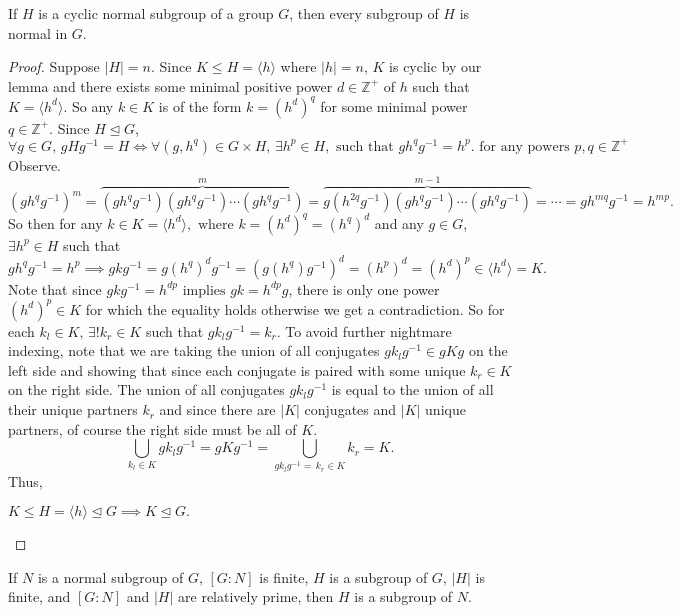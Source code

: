 \documentclass[addpoints,10pt]{exam}
\theoremstyle{plain}
\theoremstyle{definition}
\newtheorem{prob}[thm]{Problem}
\theoremstyle{plain}
\theoremstyle{plain}
\theoremstyle{definition}
\let\oldprob\prob
\let\endoldprob\endprob
\renewenvironment{prob}
  {\begin{singlespace}\oldprob}
  {\endoldprob\end{singlespace}}
\newcommand{\ZZ}{\ensuremath{\mathbb{Z}}}
\begin{document}
\begin{prob}
  If $H$ is a cyclic normal subgroup of a group $G$, then every subgroup of $H$ is normal in $G$.
\end{prob}
\begin{proof}
  Suppose $|H|=n$. Since $K\leq H=\langle h\rangle$ where $|h|=n$, $K$ is cyclic by our lemma and there exists some minimal positive power $d \in \ZZ^{+}$ of $h$ such that $K=\langle h^{d}\rangle.$ So any $k\in K$ is of the form $k=(h^{d})^{q}$ for some minimal power $q\in \ZZ^{+}$. Since $H\trianglelefteq G$, 
  $$\forall g\in G,\,gHg^{-1}=H\iff \forall (g,h^{q})\in G\times H,\,\exists h^{p}\in H,\text{ such that }gh^{q}g^{-1}=h^{p}.\text{ for any powers }p,q\in \ZZ^{+}$$
  Observe.
    $$(gh^{q}g^{-1})^{m}=\overbrace{(gh^{q}g^{-1})(gh^{q}g^{-1})\cdots (gh^{q}g^{-1})}^{m}=\overbrace{g(h^{2q}g^{-1})(gh^{q}g^{-1})\cdots (gh^{q}g^{-1})}^{m-1}=\cdots=gh^{mq}g^{-1}=h^{mp}.$$
  So then for any $k\in K=\langle h^{d}\rangle,\text{ where }k=(h^{d})^{q}=(h^{q})^{d}$ and any $g\in G$, $\exists h^{p}\in H$ such that
    $$gh^{q}g^{-1}=h^{p}\implies gkg^{-1}=g(h^{q})^{d}g^{-1}=(g(h^{q})g^{-1})^{d}=(h^{p})^{d}=(h^{d})^{p}\in \langle h^{d}\rangle=K.$$
  Note that since $gkg^{-1}=h^{dp}\text{ implies }gk=h^{dp}g$, there is only one power $(h^{d})^{p}\in K$ for which the equality holds otherwise we get a contradiction. So for each $k_{l}\in K,\,\exists! k_{r}\in K$ such that $gk_{l}g^{-1}=k_{r}$. To avoid further nightmare indexing, note that we are taking the union of all conjugates $gk_{l}g^{-1}\in gKg$ on the left side and showing that since each conjugate is paired with some unique $k_{r}\in K$ on the right side. The union of all conjugates $gk_{l}g^{-1}$ is equal to the union of all their unique partners $k_{r}$ and since there are $|K|$ conjugates and $|K|$ unique partners, of course the right side must be all of $K$.
  $$\bigcup_{k_{l}\in K}gk_{l}g^{-1}=gKg^{-1}=\bigcup_{gk_{l}g^{-1}=\,k_{r}\in K} k_{r}=K.$$
  Thus,
  \begin{center}
    $K\leq H=\langle h\rangle\trianglelefteq G\implies K\trianglelefteq G.$
  \end{center}

\end{proof}
\newpage
\setcounter{thm}{18}   %

\begin{prob}
If $N$ is a normal subgroup of $G$, $[G:N]$ is finite, $H$ is a subgroup of $G$, $|H|$ is finite, and $[G:N]$ and $|H|$ are relatively prime, then $H$ is a subgroup of $N$.
\end{prob}
\end{document}
